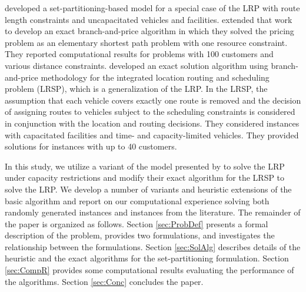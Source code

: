 \documentclass[graybox]{./styles/svmult}
\begin{document}
\citet{Berger} developed a set-partitioning-based model for a special
case of the LRP with route length constraints and uncapacitated
vehicles and facilities. \citet{Berger07} extended that work to
develop an exact branch-and-price algorithm in which they solved the
pricing problem as an elementary shortest path problem with one
resource constraint. They reported computational results for problems
with 100 customers and various distance constraints. \citet{Akca}
developed an exact solution algorithm using branch-and-price
methodology for the integrated location routing and scheduling problem
(LRSP), which is a generalization of the LRP. In the LRSP, the
assumption that each vehicle covers exactly one route is removed and
the decision of assigning routes to vehicles subject to the scheduling
constraints is considered in conjunction with the location and routing
decisions. They considered instances with capacitated facilities and
time- and capacity-limited vehicles. They provided solutions for
instances with up to 40 customers.
 
In this study, we utilize a variant of the model presented by
\citet{Akca} to solve the LRP under capacity restrictions and modify
their exact algorithm for the LRSP to solve the LRP. We develop a
number of variants and heuristic extensions of the basic algorithm and
report on our computational experience solving both randomly generated
instances and instances from the literature. The remainder of the
paper is organized as follows. Section \ref{sec:ProbDef} presents a
formal description of the problem, provides two formulations, and
investigates the relationship between the formulations. Section
\ref{sec:SolAlg} describes details of the heuristic and the exact
algorithms for the set-partitioning formulation. Section \ref{sec:CompR}
provides some computational results evaluating the performance of the
algorithms. Section \ref{sec:Conc} concludes the paper.
\end{document}
